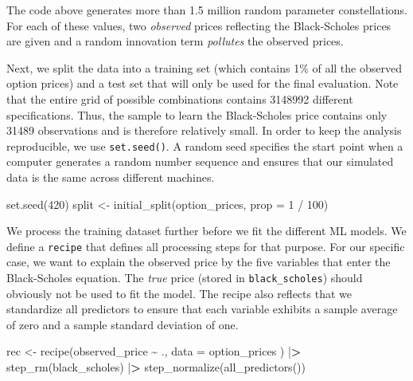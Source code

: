 \documentclass[
]{book}
\newenvironment{Shaded}{\begin{snugshade}}{\end{snugshade}}
\newcommand{\AttributeTok}[1]{\textcolor[rgb]{0.61,0.61,0.61}{#1}}
\newcommand{\DecValTok}[1]{\textcolor[rgb]{0.06,0.06,0.06}{#1}}
\newcommand{\ErrorTok}[1]{\textcolor[rgb]{0.14,0.14,0.14}{\textbf{#1}}}
\newcommand{\FunctionTok}[1]{\textcolor[rgb]{0,0,0}{#1}}
\newcommand{\NormalTok}[1]{#1}
\newcommand{\OtherTok}[1]{\textcolor[rgb]{0.37,0.37,0.37}{#1}}
\newcommand{\SpecialCharTok}[1]{\textcolor[rgb]{0,0,0}{#1}}
\begin{document}
The code above generates more than 1.5 million random parameter constellations. For each of these values, two \emph{observed} prices reflecting the Black-Scholes prices are given and a random innovation term \emph{pollutes} the observed prices.

Next, we split the data into a training set (which contains 1\% of all the observed option prices) and a test set that will only be used for the final evaluation. Note that the entire grid of possible combinations contains 3148992 different specifications. Thus, the sample to learn the Black-Scholes price contains only 31489 observations and is therefore relatively small.
In order to keep the analysis reproducible, we use \texttt{set.seed()}. A random seed specifies the start point when a computer generates a random number sequence and ensures that our simulated data is the same across different machines.

\begin{Shaded}
\begin{Highlighting}[]
\FunctionTok{set.seed}\NormalTok{(}\DecValTok{420}\NormalTok{)}
\NormalTok{split }\OtherTok{\textless{}{-}} \FunctionTok{initial\_split}\NormalTok{(option\_prices, }\AttributeTok{prop =} \DecValTok{1} \SpecialCharTok{/} \DecValTok{100}\NormalTok{)}
\end{Highlighting}
\end{Shaded}

We process the training dataset further before we fit the different ML models. We define a \texttt{recipe} that defines all processing steps for that purpose. For our specific case, we want to explain the observed price by the five variables that enter the Black-Scholes equation. The \emph{true} price (stored in \texttt{black\_scholes}) should obviously not be used to fit the model. The recipe also reflects that we standardize all predictors to ensure that each variable exhibits a sample average of zero and a sample standard deviation of one.

\begin{Shaded}
\begin{Highlighting}[]
\NormalTok{rec }\OtherTok{\textless{}{-}} \FunctionTok{recipe}\NormalTok{(observed\_price }\SpecialCharTok{\textasciitilde{}}\NormalTok{ .,}
  \AttributeTok{data =}\NormalTok{ option\_prices}
\NormalTok{) }\SpecialCharTok{|}\ErrorTok{\textgreater{}}
  \FunctionTok{step\_rm}\NormalTok{(black\_scholes) }\SpecialCharTok{|}\ErrorTok{\textgreater{}}
  \FunctionTok{step\_normalize}\NormalTok{(}\FunctionTok{all\_predictors}\NormalTok{())}
\end{Highlighting}
\end{Shaded}
\end{document}
